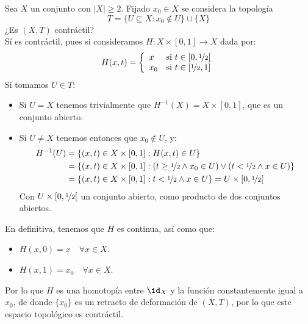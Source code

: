 \documentclass[12pt]{article}
\begin{document}
    \begin{ejercicio}[2.5 puntos]
        Sea $X$ un conjunto con $|X|\geq 2$. Fijado $x_0\in X$ se considera la topología
        \begin{equation*}
            T = \{U\subseteq X : x_0\notin U\}\cup \{X\}
        \end{equation*}
        ¿Es $(X,T)$ contráctil?\\

        \noindent
        Sí es contráctil, pues si consideramos $H:X\times [0,1]\to X$ dada por:
        \begin{equation*}
            H(x,t) = \left\{\begin{array}{ll}
                x & \text{si\ } t\in \left[0,\nicefrac{1}{2}\right[ \\
                    x_0 & \text{si\ } t\in [\nicefrac{1}{2},1]
            \end{array}\right. 
        \end{equation*}
        Si tomamos $U\in T$:
        \begin{itemize}
            \item Si $U=X$ tenemos trivialmente que $H^{-1}(X) = X\times [0,1]$, que es un conjunto abierto.
            \item Si $U\neq X$ tenemos entonces que $x_0\notin U$, y:
                \begin{align*}
                    H^{-1}(U) &= \{(x,t)\in X\times [0,1] : H(x,t) \in U\} \\
                              &= \{(x,t)\in X\times [0,1]: (t\geq \nicefrac{1}{2}\land x_0 \in U) \lor (t<\nicefrac{1}{2}\land x\in U)\} \\
                              &=\{(x,t)\in X\times [0,1]: t<\nicefrac{1}{2}\land x\in U\} = U\times \left[0,\nicefrac{1}{2}\right[
                \end{align*}
                Con $U\times \left[0,\nicefrac{1}{2}\right[$ un conjunto abierto, como producto de dos conjuntos abiertos.
        \end{itemize}
        En definitiva, tenemos que $H$ es continua, así como que:
        \begin{itemize}
            \item $H(x,0) = x \quad \forall x\in X$.
            \item $H(x,1) = x_0\quad \forall x\in X$.
        \end{itemize}
        Por lo que $H$ es una homotopía entre $\id_X$ y la función constantemente igual a $x_0$, de donde $\{x_0\}$ es un retracto de deformación de $(X,T)$, por lo que este espacio topológico es contráctil.
    \end{ejercicio}
\end{document}
